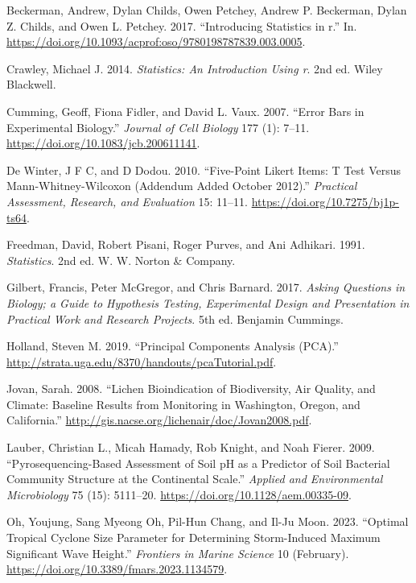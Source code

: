 \documentclass[
  letterpaper,
  DIV=11,
  numbers=noendperiod]{scrreprt}
\newlength{\cslhangindent}
\newenvironment{CSLReferences}[2] %
 {\begin{list}{}{%
  \setlength{\itemindent}{0pt}
  \setlength{\leftmargin}{0pt}
  \setlength{\parsep}{0pt}
  \ifodd #1
   \setlength{\leftmargin}{\cslhangindent}
   \setlength{\itemindent}{-1\cslhangindent}
  \fi
  \setlength{\itemsep}{#2\baselineskip}}}
 {\end{list}}
\begin{document}
\label{refs}
\begin{CSLReferences}{1}{0}
Beckerman, Andrew, Dylan Childs, Owen Petchey, Andrew P. Beckerman,
Dylan Z. Childs, and Owen L. Petchey. 2017. {``Introducing Statistics in
r.''} In.
\url{https://doi.org/10.1093/acprof:oso/9780198787839.003.0005}.

Crawley, Michael J. 2014. \emph{Statistics: An Introduction Using r}.
2nd ed. Wiley Blackwell.

Cumming, Geoff, Fiona Fidler, and David L. Vaux. 2007. {``Error Bars in
Experimental Biology.''} \emph{Journal of Cell Biology} 177 (1): 7--11.
\url{https://doi.org/10.1083/jcb.200611141}.

De Winter, J F C, and D Dodou. 2010. {``Five-Point Likert Items: T Test
Versus Mann-Whitney-Wilcoxon (Addendum Added October 2012).''}
\emph{Practical Assessment, Research, and Evaluation} 15: 11--11.
\url{https://doi.org/10.7275/bj1p-ts64}.

Freedman, David, Robert Pisani, Roger Purves, and Ani Adhikari. 1991.
\emph{Statistics}. 2nd ed. W. W. Norton \& Company.

Gilbert, Francis, Peter McGregor, and Chris Barnard. 2017. \emph{Asking
Questions in Biology; a Guide to Hypothesis Testing, Experimental Design
and Presentation in Practical Work and Research Projects}. 5th ed.
Benjamin Cummings.

Holland, Steven M. 2019. {``Principal Components Analysis (PCA).''}
\url{http://strata.uga.edu/8370/handouts/pcaTutorial.pdf}.

Jovan, Sarah. 2008. {``Lichen Bioindication of Biodiversity, Air
Quality, and Climate: Baseline Results from Monitoring in Washington,
Oregon, and California.''}
\url{http://gis.nacse.org/lichenair/doc/Jovan2008.pdf}.

Lauber, Christian L., Micah Hamady, Rob Knight, and Noah Fierer. 2009.
{``Pyrosequencing-Based Assessment of Soil pH as a Predictor of Soil
Bacterial Community Structure at the Continental Scale.''} \emph{Applied
and Environmental Microbiology} 75 (15): 5111--20.
\url{https://doi.org/10.1128/aem.00335-09}.

Oh, Youjung, Sang Myeong Oh, Pil-Hun Chang, and Il-Ju Moon. 2023.
{``Optimal Tropical Cyclone Size Parameter for Determining Storm-Induced
Maximum Significant Wave Height.''} \emph{Frontiers in Marine Science}
10 (February). \url{https://doi.org/10.3389/fmars.2023.1134579}.


\end{CSLReferences}
\end{document}
